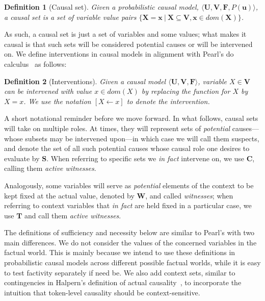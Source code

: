 \documentclass[twoside,11pt]{article}
\newtheorem{definition}{Definition}
\begin{document}
\begin{definition}[Causal set]
    Given a probabilistic causal model, \linebreak  \(\langle \mathbf{U}, \mathbf{V}, \mathbf{F}, P(\mathbf{u})\rangle\), a causal set is a set of variable value pairs \(\{\mathbf{X} = \mathbf{x} ~|~ \mathbf{X} \subseteq  \mathbf{V}, \mathbf{x} \in \mathit{dom}(\mathbf{X})\}\). 
\end{definition}
\noindent As such, a causal set is just a set of variables and some values; what makes it causal is that such sets will be considered potential causes or will be intervened on. 
We define interventions in causal models in alignment with Pearl's do calculus~\cite{causalityPearl}  as follows:

\begin{definition}[Interventions]
    Given a causal model \(\langle \mathbf{U}, \mathbf{V}, \mathbf{F} \rangle\), variable \(X \in \mathbf{V}\) can be intervened with value \(x \in \textit{dom}(X)\) by replacing the function for \(X\) by \(X = x\). We use the notation \([X \leftarrow x]\) to denote the intervention.
\end{definition}

\noindent A short notational reminder before we move forward. In what follows, causal sets will take on multiple roles. At times, they will represent sets of \emph{potential} causes---whose subsets may be intervened upon---in which case we will call them suspects, and denote the set of all such potential causes whose causal role one desires to evaluate by $\mathbf{S}$. When referring to specific sets we \emph{in fact} intervene on, we use $\mathbf{C}$, calling them \emph{active witnesses}.

Analogously, some variables will serve as \emph{potential} elements of the context to be kept fixed at the actual value, denoted by $\mathbf{W}$, and called \emph{witnesses};  when referring to context variables that \emph{in fact} are held fixed in a particular case, we use $\mathbf{T}$ and call them \emph{active witnesses}.


The definitions of sufficiency and necessity below are similar to Pearl's with two main differences. We do not consider the values of the concerned variables in the factual world. This is mainly because we intend to use these definitions in probabilistic causal models across different possible factual worlds, while it is easy to test factivity separately if need be. We also add context sets,  similar to contingencies in Halpern's definition of actual causality~\cite{actualCausalityHalpern}, to incorporate the intuition that token-level causality should be context-sensitive.
\end{document}
